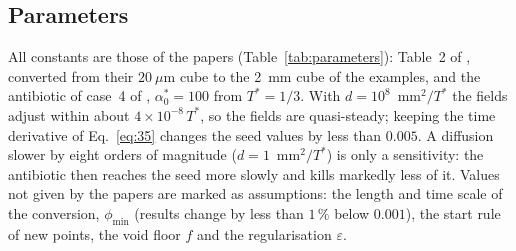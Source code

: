 \documentclass[11pt,a4paper]{article}
\begin{document}
\subsection{Parameters}
\label{sec:parameters}

All constants are those of the papers (Table~\ref{tab:parameters}): Table~2 of \citet{Klempt2024DiffusionDrivenGrowth}, converted from their $20~\mu$m cube to the 2~mm cube of the examples, and the antibiotic of case~4 of \citet{Klempt2026ContinuumBacterialGrowth}, $\alpha^*_0=100$ from $T^*=1/3$. With $d=10^8$~mm$^2/T^*$ the fields adjust within about $4\times10^{-8}\,T^*$, so the fields are quasi-steady; keeping the time derivative of Eq.~\eqref{eq:35} changes the seed values by less than $0.005$. A diffusion slower by eight orders of magnitude ($d=1$~mm$^2/T^*$) is only a sensitivity: the antibiotic then reaches the seed more slowly and kills markedly less of it. Values not given by the papers are marked as assumptions: the length and time scale of the conversion, $\phi_{\min}$ (results change by less than $1\,\%$ below $0.001$), the start rule of new points, the void floor $f$ and the regularisation $\varepsilon$.
\end{document}
